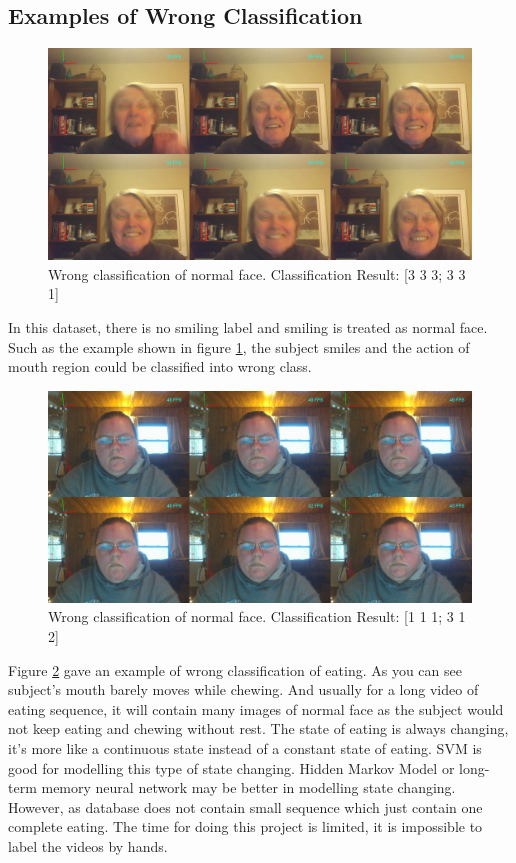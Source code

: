\subsection{Examples of Wrong Classification}
\begin{figure}[ht]
\centering
\includegraphics[width = \textwidth]{imgs/Wrong_NF00.jpg}
\caption{Wrong classification of normal face. Classification Result: [3 3 3; 3 3 1]}
\label{fig:EXPNF}
\end{figure}
In this dataset, there is no smiling label and smiling is treated as normal face. Such as the example shown in figure \ref{fig:EXPNF}, the subject smiles and the action of mouth region could be classified into wrong class.
\begin{figure}[ht]
\centering
\includegraphics[width = \textwidth]{imgs/Wrong_E00.jpg}
\caption{Wrong classification of normal face. Classification Result: [1 1 1; 3 1 2]}
\label{fig:EXPE}
\end{figure}
\newline
Figure \ref{fig:EXPE} gave an example of wrong classification of eating. As you can see subject's mouth barely moves while chewing. And usually for a long video of eating sequence, it will contain many images of normal face as the subject would not keep eating and chewing without rest. The state of eating is always changing, it's more like a continuous state instead of a constant state of eating. SVM is good for modelling this type of state changing. Hidden Markov Model or long-term memory neural network may be better in modelling state changing. However, as database does not contain small sequence which just contain one complete eating. The time for doing this project is limited, it is  impossible to label the videos by hands.
